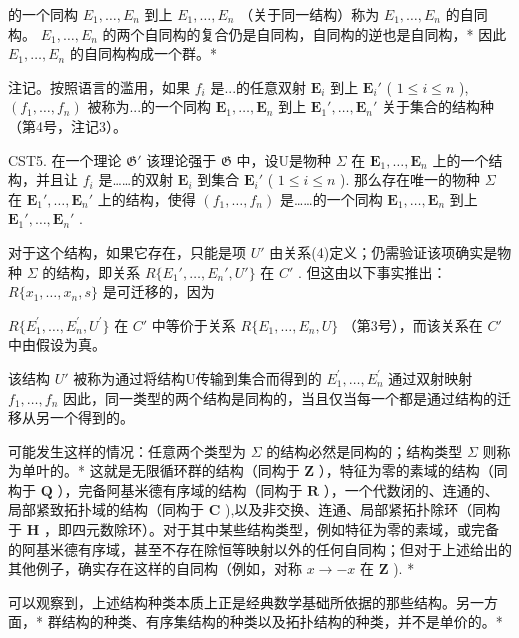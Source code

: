 的一个同构 \(E_{1}, \ldots, E_{n}\) 到上 \(E_{1}, \ldots, E_{n}\) （关于同一结构）称为 \(E_{1}, \ldots, E_{n}\) 的自同构。 \(E_{1}, \ldots, E_{n}\) 的两个自同构的复合仍是自同构，自同构的逆也是自同构，* 因此 \(E_{1}, \ldots, E_{n}\) 的自同构构成一个群。*

注记。按照语言的滥用，如果 \(f_{i}\) 是...的任意双射 \(\mathbf{E}_i\) 到上 \(\mathbf{E}_i'\) ( \(1 \leqslant i \leqslant n\) ), \((f_1, \ldots, f_n)\) 被称为...的一个同构 \(\mathbf{E}_1, \ldots, \mathbf{E}_n\) 到上 \(\mathbf{E}_1', \ldots, \mathbf{E}_n'\) 关于集合的结构种（第4号，注记3）。

CST5. 在一个理论 \(\mathfrak{G}'\) 该理论强于 \(\mathfrak{G}\) 中，设U是物种 \(\Sigma\) 在 \(\mathbf{E}_1, \ldots, \mathbf{E}_n\) 上的一个结构，并且让 \(f_i\) 是……的双射 \(\mathbf{E}_i\) 到集合 \(\mathbf{E}_i'\) ( \(1 \leqslant i \leqslant n\) ). 那么存在唯一的物种 \(\Sigma\) 在 \(\mathbf{E}_1', \ldots, \mathbf{E}_n'\) 上的结构，使得 \((f_1, \ldots, f_n)\) 是……的一个同构 \(\mathbf{E}_1, \ldots, \mathbf{E}_n\) 到上 \(\mathbf{E}_1', \ldots, \mathbf{E}_n'\) .

对于这个结构，如果它存在，只能是项 \(U'\) 由关系(4)定义；仍需验证该项确实是物种 \(\Sigma\) 的结构，即关系 \(R\{E_{1}', \ldots, E_{n}', U'\}\) 在 \(C'\) . 但这由以下事实推出： \(R\{x_{1}, \ldots, x_{n}, s\}\) 是可迁移的，因为

\(R\{E_{1}^{\prime},\ldots,E_{n}^{\prime},U^{\prime}\}\) 在 \(C'\) 中等价于关系 \(R\{E_{1},\ldots,E_{n},U\}\) （第3号），而该关系在 \(C'\) 中由假设为真。

该结构 \(U'\) 被称为通过将结构U传输到集合而得到的 \(E_{1}^{\prime}, \ldots, E_{n}^{\prime}\) 通过双射映射 \(f_{1}, \ldots, f_{n}\) 因此，同一类型的两个结构是同构的，当且仅当每一个都是通过结构的迁移从另一个得到的。

可能发生这样的情况：任意两个类型为 \(\Sigma\) 的结构必然是同构的；结构类型 \(\Sigma\) 则称为单叶的。* 这就是无限循环群的结构（同构于 \(\mathbf{Z}\) ），特征为零的素域的结构（同构于 \(\mathbf{Q}\) ），完备阿基米德有序域的结构（同构于 \(\mathbf{R}\) ），一个代数闭的、连通的、局部紧致拓扑域的结构（同构于 \(\mathbf{C}\) ),以及非交换、连通、局部紧拓扑除环（同构于 \(\mathbf{H}\) ，即四元数除环）。对于其中某些结构类型，例如特征为零的素域，或完备的阿基米德有序域，甚至不存在除恒等映射以外的任何自同构；但对于上述给出的其他例子，确实存在这样的自同构（例如，对称 \(x \to -x\) 在 \(\mathbf{Z}\) ). *

可以观察到，上述结构种类本质上正是经典数学基础所依据的那些结构。另一方面，* 群结构的种类、有序集结构的种类以及拓扑结构的种类，并不是单价的。*

